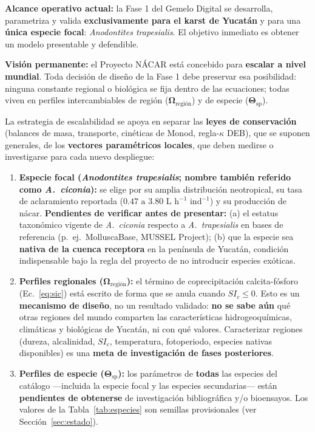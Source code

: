 \documentclass[11pt,letterpaper]{article}
\begin{document}
\begin{destacado}
\textbf{Alcance operativo actual:} la Fase 1 del Gemelo Digital se desarrolla, parametriza y valida \textbf{exclusivamente para el karst de Yucatán} y para una \textbf{única especie focal}: \textit{Anodontites trapesialis}. El objetivo inmediato es obtener un modelo presentable y defendible.

\textbf{Visión permanente:} el Proyecto NÁCAR está concebido para \textbf{escalar a nivel mundial}. Toda decisión de diseño de la Fase 1 debe preservar esa posibilidad: ninguna constante regional o biológica se fija dentro de las ecuaciones; todas viven en perfiles intercambiables de región ($\boldsymbol{\Omega}_{\text{región}}$) y de especie ($\boldsymbol{\Theta}_{\text{sp}}$).
\end{destacado}

La estrategia de escalabilidad se apoya en separar las \textbf{leyes de conservación} (balances de masa, transporte, cinéticas de Monod, regla-$\kappa$ DEB), que se suponen generales, de los \textbf{vectores paramétricos locales}, que deben medirse o investigarse para cada nuevo despliegue:
\begin{enumerate}[leftmargin=1.5em,noitemsep]
    \item \textbf{Especie focal (\textit{Anodontites trapesialis}; nombre también referido como \textit{A.\ ciconia}):} se elige por su amplia distribución neotropical, su tasa de aclaramiento reportada ($0.47\text{ a }3.80\text{ L h}^{-1}\text{ ind}^{-1}$) y su producción de nácar. \textbf{Pendientes de verificar antes de presentar:} (a) el estatus taxonómico vigente de \textit{A.\ ciconia} respecto a \textit{A.\ trapesialis} en bases de referencia (p.\ ej.\ MolluscaBase, MUSSEL Project); (b) que la especie sea \textbf{nativa de la cuenca receptora} en la península de Yucatán, condición indispensable bajo la regla del proyecto de no introducir especies exóticas.
    \item \textbf{Perfiles regionales ($\boldsymbol{\Omega}_{\text{región}}$):} el término de coprecipitación calcita-fósforo (Ec.~\ref{eq:sic}) está escrito de forma que se anula cuando $SI_c \le 0$. Esto es un \textbf{mecanismo de diseño}, no un resultado validado: \textbf{no se sabe aún} qué otras regiones del mundo comparten las características hidrogeoquímicas, climáticas y biológicas de Yucatán, ni con qué valores. Caracterizar regiones (dureza, alcalinidad, $SI_c$, temperatura, fotoperiodo, especies nativas disponibles) es una \textbf{meta de investigación de fases posteriores}.
    \item \textbf{Perfiles de especie ($\boldsymbol{\Theta}_{\text{sp}}$):} los parámetros de \textbf{todas} las especies del catálogo ---incluida la especie focal y las especies secundarias--- están \textbf{pendientes de obtenerse} de investigación bibliográfica y/o bioensayos. Los valores de la Tabla~\ref{tab:especies} son semillas provisionales (ver Sección~\ref{sec:estado}).
\end{enumerate}
\end{document}
